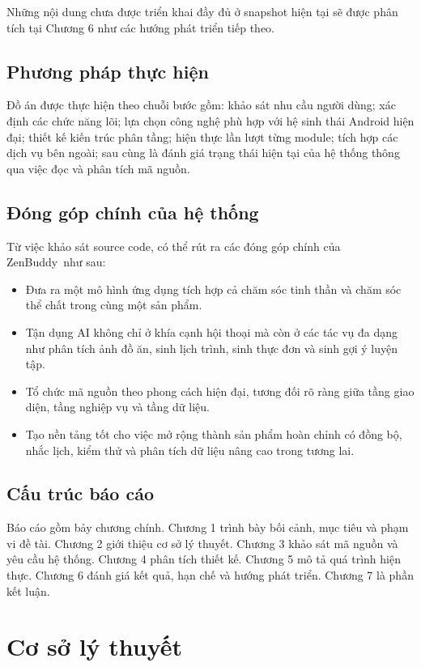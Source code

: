 \documentclass{zenbuddy-report}
\newcommand{\appname}{ZenBuddy}
\begin{document}
Những nội dung chưa được triển khai đầy đủ ở snapshot hiện tại sẽ được phân tích tại Chương 6 như các hướng phát triển tiếp theo.

\section{Phương pháp thực hiện}
Đồ án được thực hiện theo chuỗi bước gồm: khảo sát nhu cầu người dùng; xác định các chức năng lõi; lựa chọn công nghệ phù hợp với hệ sinh thái Android hiện đại; thiết kế kiến trúc phân tầng; hiện thực lần lượt từng module; tích hợp các dịch vụ bên ngoài; sau cùng là đánh giá trạng thái hiện tại của hệ thống thông qua việc đọc và phân tích mã nguồn.

\section{Đóng góp chính của hệ thống}
Từ việc khảo sát source code, có thể rút ra các đóng góp chính của \appname\ như sau:
\begin{itemize}
  \item Đưa ra một mô hình ứng dụng tích hợp cả chăm sóc tinh thần và chăm sóc thể chất trong cùng một sản phẩm.
  \item Tận dụng AI không chỉ ở khía cạnh hội thoại mà còn ở các tác vụ đa dạng như phân tích ảnh đồ ăn, sinh lịch trình, sinh thực đơn và sinh gợi ý luyện tập.
  \item Tổ chức mã nguồn theo phong cách hiện đại, tương đối rõ ràng giữa tầng giao diện, tầng nghiệp vụ và tầng dữ liệu.
  \item Tạo nền tảng tốt cho việc mở rộng thành sản phẩm hoàn chỉnh có đồng bộ, nhắc lịch, kiểm thử và phân tích dữ liệu nâng cao trong tương lai.
\end{itemize}

\section{Cấu trúc báo cáo}
Báo cáo gồm bảy chương chính. Chương 1 trình bày bối cảnh, mục tiêu và phạm vi đề tài. Chương 2 giới thiệu cơ sở lý thuyết. Chương 3 khảo sát mã nguồn và yêu cầu hệ thống. Chương 4 phân tích thiết kế. Chương 5 mô tả quá trình hiện thực. Chương 6 đánh giá kết quả, hạn chế và hướng phát triển. Chương 7 là phần kết luận.

\chapter{Cơ sở lý thuyết}
\end{document}
